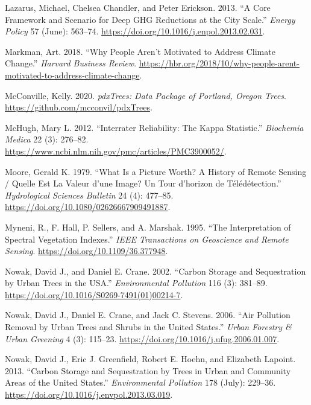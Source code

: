 \documentclass[12pt,twoside]{reedthesis}
\newlength{\cslhangindent}
\newenvironment{CSLReferences}[2] %
 {%
  \setlength{\parindent}{0pt}
  \ifodd #1 \everypar{\setlength{\hangindent}{\cslhangindent}}\ignorespaces\fi
  \ifnum #2 > 0
  \setlength{\parskip}{#2\baselineskip}
  \fi
 }%
 {}
\begin{document}
\begin{CSLReferences}{1}{0}
\leavevmode{}%
Lazarus, Michael, Chelsea Chandler, and Peter Erickson. 2013. {``A Core Framework and Scenario for Deep GHG Reductions at the City Scale.''} \emph{Energy Policy} 57 (June): 563--74. \url{https://doi.org/10.1016/j.enpol.2013.02.031}.

\leavevmode{}%
Markman, Art. 2018. {``Why People Aren{'}t Motivated to Address Climate Change.''} \emph{Harvard Business Review}. \url{https://hbr.org/2018/10/why-people-arent-motivated-to-address-climate-change}.

\leavevmode{}%
McConville, Kelly. 2020. \emph{pdxTrees: Data Package of Portland, Oregon Trees}. \url{https://github.com/mcconvil/pdxTrees}.

\leavevmode{}%
McHugh, Mary L. 2012. {``Interrater Reliability: The Kappa Statistic.''} \emph{Biochemia Medica} 22 (3): 276--82. \url{https://www.ncbi.nlm.nih.gov/pmc/articles/PMC3900052/}.

\leavevmode{}%
Moore, Gerald K. 1979. {``What Is a Picture Worth? A History of Remote Sensing / Quelle Est La Valeur d'une Image? Un Tour d'horizon de Télédétection.''} \emph{Hydrological Sciences Bulletin} 24 (4): 477--85. \url{https://doi.org/10.1080/02626667909491887}.

\leavevmode{}%
Myneni, R., F. Hall, P. Sellers, and A. Marshak. 1995. {``The Interpretation of Spectral Vegetation Indexes.''} \emph{IEEE Transactions on Geoscience and Remote Sensing}. \url{https://doi.org/10.1109/36.377948}.

\leavevmode{}%
Nowak, David J., and Daniel E. Crane. 2002. {``Carbon Storage and Sequestration by Urban Trees in the USA.''} \emph{Environmental Pollution} 116 (3): 381--89. \url{https://doi.org/10.1016/S0269-7491(01)00214-7}.

\leavevmode{}%
Nowak, David J., Daniel E. Crane, and Jack C. Stevens. 2006. {``Air Pollution Removal by Urban Trees and Shrubs in the United States.''} \emph{Urban Forestry \& Urban Greening} 4 (3): 115--23. \url{https://doi.org/10.1016/j.ufug.2006.01.007}.

\leavevmode{}%
Nowak, David J., Eric J. Greenfield, Robert E. Hoehn, and Elizabeth Lapoint. 2013. {``Carbon Storage and Sequestration by Trees in Urban and Community Areas of the United States.''} \emph{Environmental Pollution} 178 (July): 229--36. \url{https://doi.org/10.1016/j.envpol.2013.03.019}.


\end{CSLReferences}
\end{document}
